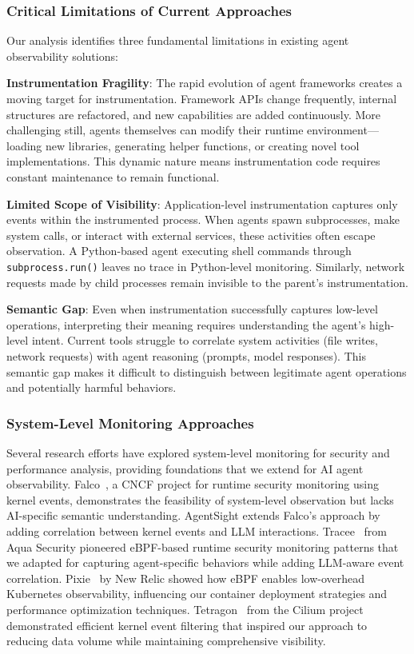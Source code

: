 \subsubsection{Critical Limitations of Current Approaches}

Our analysis identifies three fundamental limitations in existing agent observability solutions:

\textbf{Instrumentation Fragility}: The rapid evolution of agent frameworks creates a moving target for instrumentation. Framework APIs change frequently, internal structures are refactored, and new capabilities are added continuously. More challenging still, agents themselves can modify their runtime environment—loading new libraries, generating helper functions, or creating novel tool implementations. This dynamic nature means instrumentation code requires constant maintenance to remain functional.

\textbf{Limited Scope of Visibility}: Application-level instrumentation captures only events within the instrumented process. When agents spawn subprocesses, make system calls, or interact with external services, these activities often escape observation. A Python-based agent executing shell commands through \texttt{subprocess.run()} leaves no trace in Python-level monitoring. Similarly, network requests made by child processes remain invisible to the parent's instrumentation.

\textbf{Semantic Gap}: Even when instrumentation successfully captures low-level operations, interpreting their meaning requires understanding the agent's high-level intent. Current tools struggle to correlate system activities (file writes, network requests) with agent reasoning (prompts, model responses). This semantic gap makes it difficult to distinguish between legitimate agent operations and potentially harmful behaviors.

\subsubsection{System-Level Monitoring Approaches}

Several research efforts have explored system-level monitoring for security and performance analysis, providing foundations that we extend for AI agent observability. Falco~\cite{falco}, a CNCF project for runtime security monitoring using kernel events, demonstrates the feasibility of system-level observation but lacks AI-specific semantic understanding. AgentSight extends Falco's approach by adding correlation between kernel events and LLM interactions. Tracee~\cite{tracee} from Aqua Security pioneered eBPF-based runtime security monitoring patterns that we adapted for capturing agent-specific behaviors while adding LLM-aware event correlation. Pixie~\cite{pixie} by New Relic showed how eBPF enables low-overhead Kubernetes observability, influencing our container deployment strategies and performance optimization techniques. Tetragon~\cite{tetragon} from the Cilium project demonstrated efficient kernel event filtering that inspired our approach to reducing data volume while maintaining comprehensive visibility.

